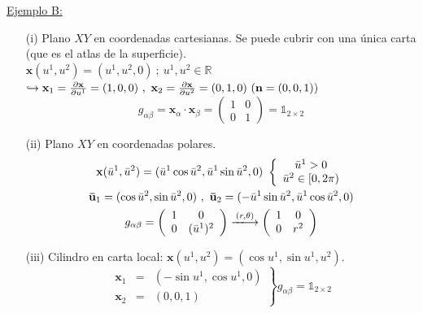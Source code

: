 \begin{mybox}
    \underline{Ejemplo B:} 
    \begin{enumerate}
        \item[(i)] Plano $XY$ en coordenadas cartesianas. Se puede cubrir con una única carta (que es el atlas de la superficie).\\
        $
        \mathbf{x}(u^1,u^2)=(u^1,u^2,0) \ ; \ u^1,u^2\in \mathbb{R}
        $\\
        $
        \hookrightarrow \mathbf{x}_1=\pdv{\mathbf{x}}{u^1}=(1,0,0) \ , \ \mathbf{x}_2=\pdv{\mathbf{x}}{u^2}=(0,1,0) \ (\mathbf{n}=(0,0,1))
        $\\
        $$
        g_{\alpha\beta}=\mathbf{x}_\alpha \cdot \mathbf{x}_\beta=\left ( \begin{array}{cc}
            1 &0 \\
            0&1 
        \end{array} \right )=\mathbb{1}_{2\times 2}
        $$

        \item[(ii)] Plano $XY$ en coordenadas polares.
        \begin{gather*}
        \mathbf{x}(\Bar{u}^1,\Bar{u}^2)=(\Bar{u}^1\cos \Bar{u}^2,\Bar{u}^1\sin \Bar{u}^2,0) \ \left \{ 
        \begin{array}{c}
             \Bar{u}^1 >0 \\
             \Bar{u}^2\in [0,2\pi) 
        \end{array}
        \right .\\
        \mathbf{\Bar{u}}_1=(\cos \Bar{u}^2,\sin \Bar{u}^2,0) \ , \ \mathbf{\Bar{u}}_2=(-\Bar{u}^1\sin \Bar{u}^2,\Bar{u}^1\cos \Bar{u}^2,0)\\
        g_{\alpha\beta}=\left ( 
        \begin{array}{cc}
             1& 0 \\
             0&(\Bar{u}^1)^2 
        \end{array}
        \right )\xlongrightarrow{(r,\theta)}\left ( 
        \begin{array}{cc}
             1&0  \\
             0& r^2
        \end{array}
        \right )
        \end{gather*}

        \item[(iii)] Cilindro en carta local: $\mathbf{x}(u^1,u^2)=(\cos u^1,\sin u^1,u^2)$.
        $$
        \left .  
        \begin{array}{ccc}
             \mathbf{x}_1&=&(-\sin u^1,\cos u^1, 0)  \\
             \mathbf{x}_2&=&(0,0,1) 
        \end{array}
        \right \}g_{\alpha\beta}=\mathbb{1}_{2\times 2}
        $$
    \end{enumerate}
\end{mybox}

